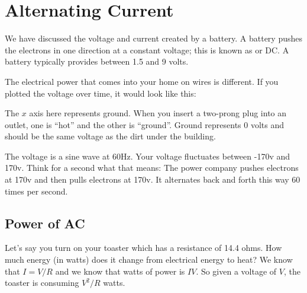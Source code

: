 \chapter{Alternating Current}

We have discussed the voltage and current created by a battery.  A
battery pushes the electrons in one direction at a constant voltage;
this is known as  or DC. A battery typically
provides between 1.5 and 9 volts.

The electrical power that comes into your home on wires is
different. If you plotted the voltage over time, it would look like
this:


The $x$ axis here represents ground. When you insert a two-prong plug
into an outlet, one is ``hot'' and the other is ``ground''. Ground
represents 0 volts and should be the same voltage as the dirt under
the building.

The voltage is a sine wave at 60Hz. Your voltage fluctuates between
-170v and 170v. Think for a second what that means: The power company
pushes electrons at 170v and then pulls electrons at 170v.  It
alternates back and forth this way 60 times per second.

\section{Power of AC}

Let's say you turn on your toaster which has a resistance of 14.4
ohms. How much energy (in watts) does it change from electrical energy
to heat?  We know that $I = V/R$ and we know that watts of power is
$IV$. So given a voltage of $V$, the toaster is consuming $V^2/R$
watts.

